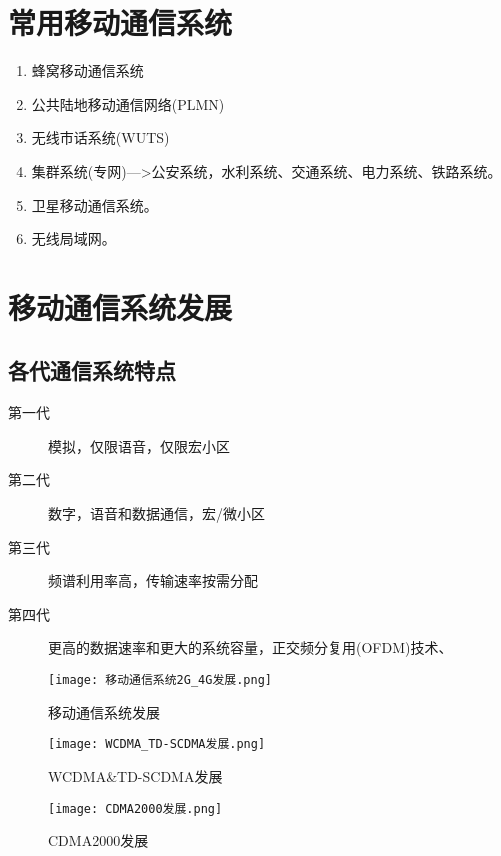 	\section{常用移动通信系统}
	\begin{enumerate}
		\item 蜂窝移动通信系统
		\item  公共陆地移动通信网络(PLMN)
		\item 无线市话系统(WUTS)
		\item 集群系统(专网)--->公安系统，水利系统、交通系统、电力系统、铁路系统。
		\item 卫星移动通信系统。
		\item 无线局域网。
	\end{enumerate}
	\section{移动通信系统发展}
	\subsection{各代通信系统特点}
	\begin{description}
		\item[第一代] 模拟，仅限语音，仅限宏小区
		\item[第二代]  数字，语音和数据通信，宏/微小区
		\item[第三代] 频谱利用率高，传输速率按需分配
		\item[第四代] 更高的数据速率和更大的系统容量，正交频分复用(OFDM)技术、
	\end{description}
	\begin{figure}[H]
		\centering
		\texttt{[image: 移动通信系统2G\_4G发展.png]}
		\caption{移动通信系统发展}
	\end{figure}
	\begin{figure}[H]
		\centering
		\texttt{[image: WCDMA\_TD-SCDMA发展.png]}
		\caption{WCDMA\&TD-SCDMA发展}
	\end{figure}
	\begin{figure}[H]
		\centering
		\texttt{[image: CDMA2000发展.png]}
		\caption{CDMA2000发展}
	\end{figure}
	
